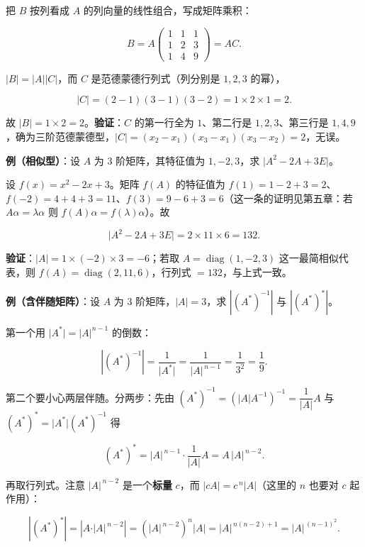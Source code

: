 \documentclass[11pt,openany,UTF8]{ctexbook}
\begin{document}
把 $B$ 按列看成 $A$ 的列向量的线性组合，写成矩阵乘积：

\[B=A\begin{pmatrix}1&1&1\\1&2&3\\1&4&9\end{pmatrix}=AC .\]

$\vert B\vert=\vert A\vert\vert C\vert$，而 $C$ 是范德蒙德行列式（列分别是 $1,2,3$ 的幂），

\[\vert C\vert=(2-1)(3-1)(3-2)=1\times2\times1=2 .\]

故 $\vert B\vert=1\times2=2$。\textbf{验证}：$C$ 的第一行全为 $1$、第二行是 $1,2,3$、第三行是 $1,4,9$，确为三阶范德蒙德型，$\vert C\vert=(x_2-x_1)(x_3-x_1)(x_3-x_2)=2$，无误。

\textbf{例（相似型）}：设 $A$ 为 $3$ 阶矩阵，其特征值为 $1,-2,3$，求 $\vert A^2-2A+3E\vert$。

设 $f(x)=x^2-2x+3$。矩阵 $f(A)$ 的特征值为 $f(1)=1-2+3=2$、$f(-2)=4+4+3=11$、$f(3)=9-6+3=6$（这一条的证明见第五章：若 $A\alpha=\lambda\alpha$ 则 $f(A)\alpha=f(\lambda)\alpha$）。故

\[\vert A^2-2A+3E\vert=2\times11\times6=132 .\]

\textbf{验证}：$\vert A\vert=1\times(-2)\times3=-6$；若取 $A=\operatorname{diag}(1,-2,3)$ 这一最简相似代表，则 $f(A)=\operatorname{diag}(2,11,6)$，行列式 $=132$，与上式一致。

\textbf{例（含伴随矩阵）}：设 $A$ 为 $3$ 阶矩阵，$\vert A\vert=3$，求 $\left\vert (A^*)^{-1}\right\vert$ 与 $\left\vert (A^*)^*\right\vert$。

第一个用 $\vert A^*\vert=\vert A\vert^{n-1}$ 的倒数：

\[\left\vert (A^*)^{-1}\right\vert=\frac{1}{\vert A^*\vert}=\frac{1}{\vert A\vert^{\,n-1}}=\frac{1}{3^{2}}=\frac{1}{9}.\]

第二个要小心两层伴随。分两步：先由 $(A^*)^{-1}=\left(\vert A\vert A^{-1}\right)^{-1}=\dfrac{1}{\vert A\vert}A$ 与 $(A^*)^*=\vert A^*\vert(A^*)^{-1}$ 得

\[(A^*)^*=\vert A\vert^{\,n-1}\cdot\frac{1}{\vert A\vert}A=A\,\vert A\vert^{\,n-2}.\]

再取行列式。注意 $\vert A\vert^{\,n-2}$ 是一个\textbf{标量} $c$，而 $\vert cA\vert=c^{\,n}\vert A\vert$（这里的 $n$ 也要对 $c$ 起作用）：

\[\left\vert (A^*)^*\right\vert=\left\vert A\cdot\vert A\vert^{\,n-2}\right\vert=\left(\vert A\vert^{\,n-2}\right)^{n}\vert A\vert=\vert A\vert^{\,n(n-2)+1}=\vert A\vert^{\,(n-1)^2}.\]
\end{document}
